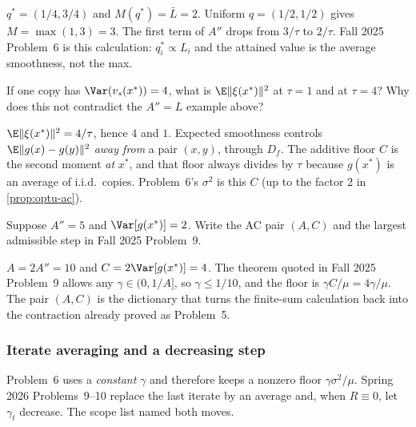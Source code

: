 \begin{solution}
$q^*=(1/4,3/4)$ and $M(q^*)=\bar L=2$. Uniform $q=(1/2,1/2)$ gives $M=\max(1,3)=3$. The first term of $A''$ drops from $3/\tau$ to $2/\tau$. Fall 2025 Problem~6 is this calculation: $q_i^*\propto L_i$ and the attained value is the average smoothness, not the max.
\end{solution}

\begin{exercise}
\label{ex:optu-var-tau}
If one copy has $\Var(v_s(x^*))=4$, what is $\E\|\xi(x^*)\|^2$ at $\tau=1$ and at $\tau=4$? Why does this not contradict the $A''=L$ example above?
\end{exercise}

\begin{solution}
$\E\|\xi(x^*)\|^2=4/\tau$, hence $4$ and $1$. Expected smoothness controls $\E\|g(x)-g(y)\|^2$ \emph{away from} a pair $(x,y)$, through $D_f$. The additive floor $C$ is the second moment \emph{at} $x^*$, and that floor always divides by $\tau$ because $g(x^*)$ is an average of i.i.d.\ copies. Problem~6's $\sigma^2$ is this $C$ (up to the factor $2$ in \cref{prop:optu-ac}).
\end{solution}

\begin{exercise}
\label{ex:optu-ac-num}
Suppose $A''=5$ and $\Var[g(x^*)]=2$. Write the AC pair $(A,C)$ and the largest admissible step in Fall 2025 Problem~9.
\end{exercise}

\begin{solution}
$A=2A''=10$ and $C=2\Var[g(x^*)]=4$. The theorem quoted in Fall 2025 Problem~9 allows any $\gamma\in(0,1/A]$, so $\gamma\le 1/10$, and the floor is $\gamma C/\mu=4\gamma/\mu$. The pair $(A,C)$ is the dictionary that turns the finite-sum calculation back into the contraction already proved as Problem~5.
\end{solution}


\subsubsection{Iterate averaging and a decreasing step}
\label{subsubsec:optu-avg}

Problem~6 uses a \emph{constant} $\gamma$ and therefore keeps a nonzero floor $\gamma\sigma^2/\mu$. Spring 2026 Problems~9--10 replace the last iterate by an average and, when $R\equiv 0$, let $\gamma_t$ decrease. The scope list named both moves.

